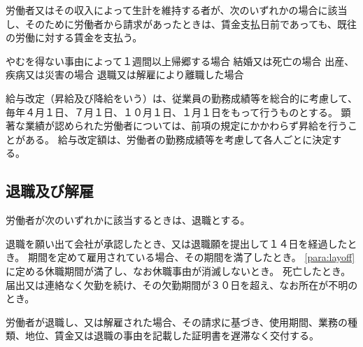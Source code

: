 \documentclass[10pt,a4paper,uplatex]{jsarticle}
\begin{document}
労働者又はその収入によって生計を維持する者が、次のいずれかの場合に該当し、そのために労働者から請求があったときは、賃金支払日前であっても、既往の労働に対する賃金を支払う。
\begin{enumerate}
    \itm やむを得ない事由によって１週間以上帰郷する場合
    \itm 結婚又は死亡の場合
    \itm 出産、疾病又は災害の場合
    \itm 退職又は解雇により離職した場合
\end{enumerate}

給与改定（昇給及び降給をいう）は、従業員の勤務成績等を総合的に考慮して、毎年４月１日、７月１日、１０月１日、１月１日をもって行うものとする。
\term
顕著な業績が認められた労働者については、前項の規定にかかわらず昇給を行うことがある。
\term
給与改定額は、労働者の勤務成績等を考慮して各人ごとに決定する。


\subsection{退職及び解雇}

労働者が次のいずれかに該当するときは、退職とする。
\begin{enumerate}
    \itm 退職を願い出て会社が承認したとき、又は退職願を提出して１４日を経過したとき。
    \itm 期間を定めて雇用されている場合、その期間を満了したとき。
    \itm \ref{para:layoff}に定める休職期間が満了し、なお休職事由が消滅しないとき。
    \itm 死亡したとき。
    \itm 届出又は連絡なく欠勤を続け、その欠勤期間が３０日を超え、なお所在が不明のとき。
\end{enumerate}
\term
労働者が退職し、又は解雇された場合、その請求に基づき、使用期間、業務の種類、地位、賃金又は退職の事由を記載した証明書を遅滞なく交付する。
\end{document}
